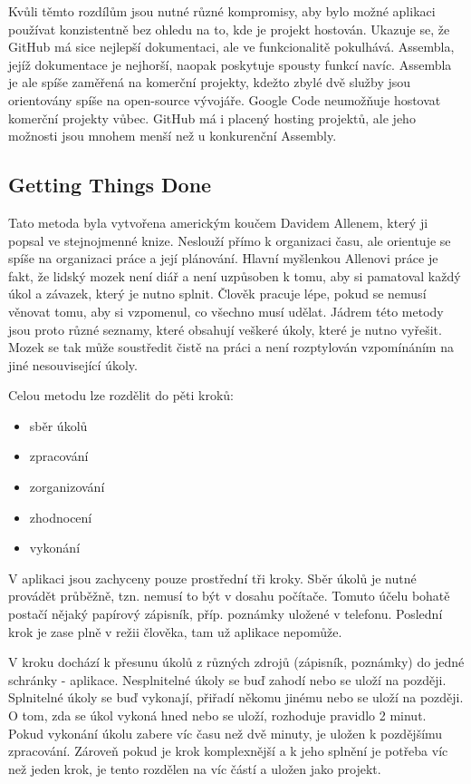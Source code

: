 Kvůli těmto rozdílům jsou nutné různé kompromisy, aby bylo možné aplikaci používat konzistentně bez ohledu na to, kde je projekt hostován. Ukazuje se, že GitHub má sice nejlepší dokumentaci, ale ve funkcionalitě pokulhává. Assembla, jejíž dokumentace je nejhorší, naopak poskytuje spousty funkcí navíc. Assembla je ale spíše zaměřená na komerční projekty, kdežto zbylé dvě služby jsou orientovány spíše na open-source vývojáře. Google Code neumožňuje hostovat komerční projekty vůbec. GitHub má i placený hosting projektů, ale jeho možnosti jsou mnohem menší než u konkurenční Assembly.

\subsection{Getting Things Done}

Tato metoda byla vytvořena americkým koučem Davidem Allenem, který ji popsal ve stejnojmenné knize. Neslouží přímo k organizaci času, ale orientuje se spíše na organizaci práce a její plánování. Hlavní myšlenkou Allenovi práce je fakt, že lidský mozek není diář a není uzpůsoben k tomu, aby si pamatoval každý úkol a závazek, který je nutno splnit. Člověk pracuje lépe, pokud se nemusí věnovat tomu, aby si vzpomenul, co všechno musí udělat. Jádrem této metody jsou proto různé seznamy, které obsahují veškeré úkoly, které je nutno vyřešit. Mozek se tak může soustředit čistě na práci a není rozptylován vzpomínáním na jiné nesouvisející úkoly.

Celou metodu lze rozdělit do pěti kroků:

\begin{itemize}
\item sběr úkolů
\item zpracování
\item zorganizování
\item zhodnocení
\item vykonání
\end{itemize}

V aplikaci jsou zachyceny pouze prostřední tři kroky. Sběr úkolů je nutné provádět průběžně, tzn. nemusí to být v dosahu počítače. Tomuto účelu bohatě postačí nějaký papírový zápisník, příp. poznámky uložené v telefonu. Poslední krok  je zase plně v režii člověka, tam už aplikace nepomůže.

V kroku  dochází k přesunu úkolů z různých zdrojů (zápisník, poznámky) do jedné schránky - aplikace. Nesplnitelné úkoly se buď zahodí nebo se uloží na později. Splnitelné úkoly se buď vykonají, přiřadí někomu jinému nebo se uloží na později. O tom, zda se úkol vykoná hned nebo se uloží, rozhoduje pravidlo 2 minut. Pokud vykonání úkolu zabere víc času než dvě minuty, je uložen k pozdějšímu zpracování. Zároveň pokud je krok komplexnější a k jeho splnění je potřeba víc než jeden krok, je tento rozdělen na víc částí a uložen jako projekt.

